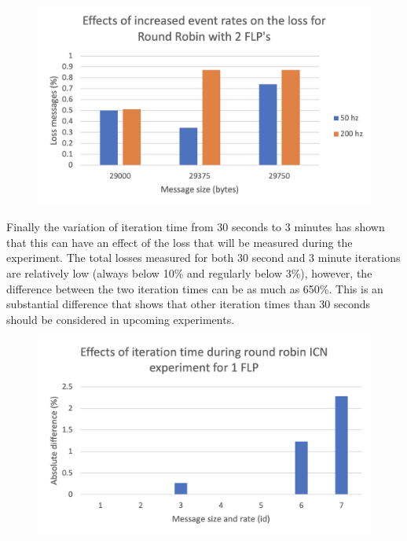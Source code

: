 \documentclass[]{article}
\begin{document}
\begin{center}
	\begin{figure}[H]
		\includegraphics[width=\textwidth]{"images/Effects of increased event rates on the loss for Round Robin with 2 FLP's"}
	\end{figure}
\end{center}

Finally the variation of iteration time from 30 seconds to 3 minutes has shown that this can have an effect of the loss that will be measured during the experiment. The total losses measured for both 30 second and 3 minute iterations are relatively low (always below 10\% and regularly below 3\%), however, the difference between the two iteration times can be as much as 650\%. This is an substantial difference that shows that other iteration times than 30 seconds should be considered in upcoming experiments.

\begin{center}
	\begin{figure}[H]
		\includegraphics[width=\textwidth]{"images/Effects of iteration time during round robin ICN experiment for 1 FLP"}
	\end{figure}
\end{center}
\end{document}

